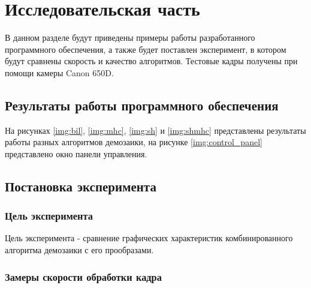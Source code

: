 \chapter{Исследовательская часть}

В данном разделе будут приведены примеры работы разработанного программного обеспечения, а также будет поставлен эксперимент, в котором будут сравнены скорость и качество алгоритмов. Тестовые кадры получены при помощи камеры Canon 650D.

\section{Результаты работы программного обеспечения}

На рисунках \ref{img:bil}, \ref{img:mhc}, \ref{img:sh} и \ref{img:shmhc} представлены результаты работы разных алгоритмов демозаики, на рисунке \ref{img:control_panel} представлено окно панели управления.


\clearpage

\section{Постановка эксперимента}

\subsection{Цель эксперимента}

Цель эксперимента - сравнение графических характеристик комбинированного алгоритма демозаики с его прообразами.

\subsection{Замеры скорости обработки кадра}

\begin{table}[h]
	\begin{center}
		\caption{Скорость обработки кадра (в тиках).}
		\label{tbl:small}
	\end{center}
\end{table}


